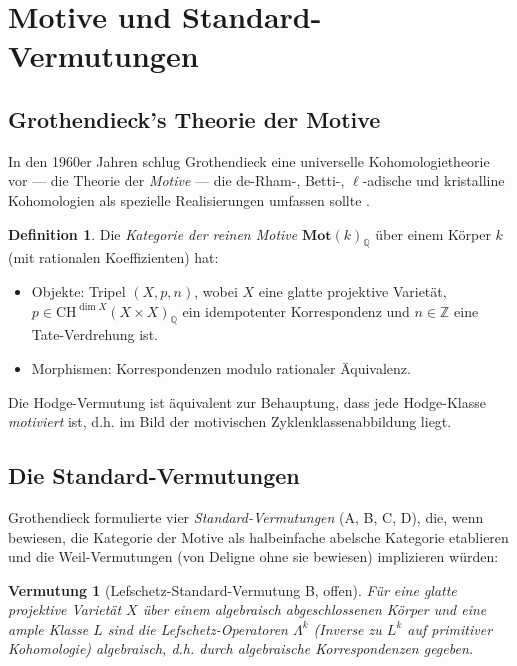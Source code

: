 \documentclass[12pt,a4paper]{amsart}
\newtheorem{vermutung}[theorem]{Vermutung}
\theoremstyle{definition}
\newtheorem{definition}[theorem]{Definition}
\theoremstyle{remark}
\begin{document}
\section{Motive und Standard-Vermutungen}
\label{sec:motive}

\subsection{Grothendieck's Theorie der Motive}

In den 1960er Jahren schlug Grothendieck eine universelle Kohomologietheorie vor —
die Theorie der \emph{Motive} — die de-Rham-, Betti-, $\ell$-adische und kristalline
Kohomologien als spezielle Realisierungen umfassen sollte \cite{grothendieck1969}.

\begin{definition}
Die \emph{Kategorie der reinen Motive} $\mathbf{Mot}(k)_\mathbb{Q}$ über einem
Körper $k$ (mit rationalen Koeffizienten) hat:
\begin{itemize}
\item Objekte: Tripel $(X, p, n)$, wobei $X$ eine glatte projektive Varietät,
  $p \in \mathrm{CH}^{\dim X}(X \times X)_\mathbb{Q}$ ein idempotenter Korrespondenz
  und $n \in \mathbb{Z}$ eine Tate-Verdrehung ist.
\item Morphismen: Korrespondenzen modulo rationaler Äquivalenz.
\end{itemize}
\end{definition}

Die Hodge-Vermutung ist äquivalent zur Behauptung, dass jede Hodge-Klasse
\emph{motiviert} ist, d.h. im Bild der motivischen Zyklenklassenabbildung liegt.

\subsection{Die Standard-Vermutungen}

Grothendieck formulierte vier \emph{Standard-Vermutungen} (A, B, C, D), die, wenn
bewiesen, die Kategorie der Motive als halbeinfache abelsche Kategorie etablieren
und die Weil-Vermutungen (von Deligne ohne sie bewiesen) implizieren würden:

\begin{vermutung}[Lefschetz-Standard-Vermutung B, offen]
\label{verm:std-b}
Für eine glatte projektive Varietät $X$ über einem algebraisch abgeschlossenen Körper
und eine ample Klasse $L$ sind die Lefschetz-Operatoren $\Lambda^k$ (Inverse zu $L^k$
auf primitiver Kohomologie) algebraisch, d.h. durch algebraische Korrespondenzen gegeben.
\end{vermutung}
\end{document}
